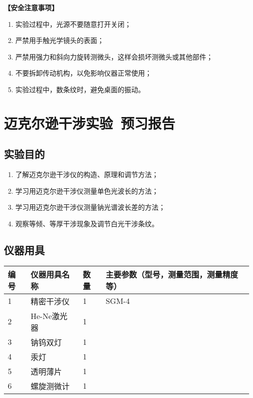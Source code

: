 \documentclass[dvipsnames, svgnames,a4paper,11pt]{article}
\newcommand{\exname}{迈克尔逊干涉实验}%
\begin{document}
\textbf{【安全注意事项】}
\begin{enumerate}
	\item 实验过程中，光源不要随意打开关闭；
	\item 严禁用手触光学镜头的表面；
	\item 严禁用强力和斜向力旋转测微头，这样会损坏测微头或其他部件；
	\item 不要拆卸传动机构，以免影响仪器正常使用；
	\item 实验过程中，数条纹时，避免桌面的振动。
\end{enumerate}


\clearpage
\tableofcontents
\clearpage

\setcounter{section}{0}
\section{\exname\ \textbf{预习报告}}
	
\subsection{实验目的}
\begin{enumerate}
	\item 了解迈克尔逊干涉仪的构造、原理和调节方法；
	\item 学习用迈克尔逊干涉仪测量单色光波长的方法；
	\item 学习用迈克尔逊干涉仪测量钠光谱波长差的方法；
	\item 观察等倾、等厚干涉现象及调节白光干涉条纹。
\end{enumerate}
\subsection{仪器用具}
\begin{table}[htbp]
	\centering
	\renewcommand\arraystretch{1.6}
	\begin{tabular}{p{}|p{}|p{}|p{}}
	\hline
	编号& 仪器用具名称 & 数量 &  主要参数（型号，测量范围，测量精度等） \\
	\hline
	1&精密干涉仪&1 &SGM-4\\
	2&He-Ne激光器&1 &\\
	3&钠钨双灯&1 &\\
	4&汞灯&1 &\\
	5&透明薄片&1 &\\
	6&螺旋测微计&1 &\\
	\hline
\end{tabular}
\end{table}
\end{document}

